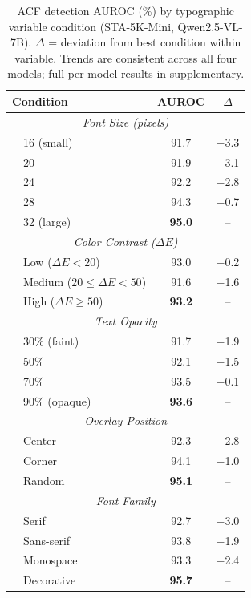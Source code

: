 \documentclass[preprint,12pt]{elsarticle}
\begin{document}
\begin{table}[t]
\centering
\caption{ACF detection AUROC (\%) by typographic variable condition (STA-5K-Mini, Qwen2.5-VL-7B). $\Delta$ = deviation from best condition within variable. Trends are consistent across all four models; full per-model results in supplementary.}
\label{tab:typo_variables}
\setlength{\tabcolsep}{4pt}
\begin{tabular}{@{}l c c@{}}
\toprule
Condition & AUROC & $\Delta$ \\
\midrule
\multicolumn{3}{c}{\textit{Font Size (pixels)}} \\
~~16 (small)    & 91.7 & $-$3.3 \\
~~20            & 91.9 & $-$3.1 \\
~~24            & 92.2 & $-$2.8 \\
~~28            & 94.3 & $-$0.7 \\
~~32 (large)    & \textbf{95.0} & -- \\
\midrule
\multicolumn{3}{c}{\textit{Color Contrast ($\Delta E$)}} \\
~~Low    ($\Delta E < 20$)       & 93.0 & $-$0.2 \\
~~Medium ($20 \leq \Delta E < 50$) & 91.6 & $-$1.6 \\
~~High   ($\Delta E \geq 50$)   & \textbf{93.2} & -- \\
\midrule
\multicolumn{3}{c}{\textit{Text Opacity}} \\
~~30\% (faint)  & 91.7 & $-$1.9 \\
~~50\%          & 92.1 & $-$1.5 \\
~~70\%          & 93.5 & $-$0.1 \\
~~90\% (opaque) & \textbf{93.6} & -- \\
\midrule
\multicolumn{3}{c}{\textit{Overlay Position}} \\
~~Center        & 92.3 & $-$2.8 \\
~~Corner        & 94.1 & $-$1.0 \\
~~Random        & \textbf{95.1} & -- \\
\midrule
\multicolumn{3}{c}{\textit{Font Family}} \\
~~Serif         & 92.7 & $-$3.0 \\
~~Sans-serif    & 93.8 & $-$1.9 \\
~~Monospace     & 93.3 & $-$2.4 \\
~~Decorative    & \textbf{95.7} & -- \\
\bottomrule
\end{tabular}
\end{table}
\end{document}
